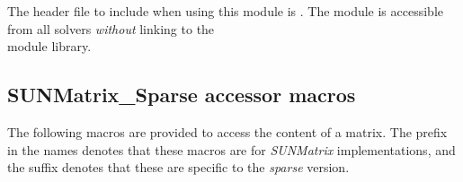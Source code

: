 \noindent The header file to include when using this module 
is . The {\sunmatsparse} module
is accessible from all {\sundials} solvers \textit{without}
linking to the \\
 module library.


\subsection{SUNMatrix\_Sparse accessor macros}
\label{ss:sunmat_sparse_macros}

The following macros are provided to access the
content of a {\sunmatsparse} matrix. The prefix  in the names
denotes that these macros are for \emph{SUNMatrix} implementations,
and the suffix  denotes that these are specific to
the \emph{sparse} version.
